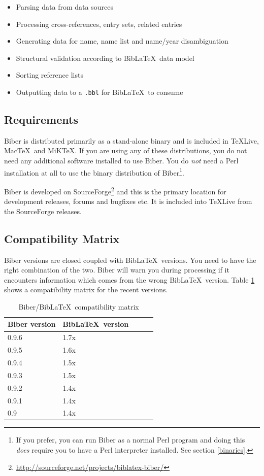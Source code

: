 \documentclass{ltxdockit}
\begin{document}
\begin{itemize}
\item Parsing data from data sources
\item Processing cross-references, entry sets, related entries
\item Generating data for name, name list and name/year disambiguation
\item Structural validation according to Bib\LaTeX\ data model
\item Sorting reference lists
\item Outputting data to a \verb+.bbl+ for Bib\LaTeX\ to consume
\end{itemize}

\subsection{Requirements}\label{ref:req}

Biber is distributed primarily as a stand-alone binary and is
included in \TeX Live, Mac\TeX\ and MiK\TeX. If you are using any of these
distributions, you do not need any additional software installed to use
Biber. You do \emph{not} need a Perl installation at all to use
the binary distribution of Biber\footnote{If you prefer, you can run
Biber as a normal Perl program and doing this \emph{does} require
you to have a Perl interpreter installed. See section \ref{binaries}.}.

Biber is developed on
SourceForge\footnote{\url{http://sourceforge.net/projects/biblatex-biber/}}
and this is the primary location for development releases, forums and
bugfixes etc. It is included into \TeX Live from the SourceForge releases.

\subsection{Compatibility Matrix}

Biber versions are closed coupled with Bib\LaTeX\ versions. You
need to have the right combination of the two. Biber will warn you
during processing if it encounters information which comes from the wrong
Bib\LaTeX\ version. Table \ref{tab:compat} shows a compatibility
matrix for the recent versions.

\begin{table}
\begin{center}
\small
\begin{tabular}{lllll}
\toprule
Biber version & Bib\LaTeX\ version\\
\midrule
0.9.6 & 1.7x\\
0.9.5 & 1.6x\\
0.9.4 & 1.5x\\
0.9.3 & 1.5x\\
0.9.2 & 1.4x\\
0.9.1 & 1.4x\\
0.9 & 1.4x\\
\bottomrule
\end{tabular}
\end{center}
\caption{Biber/Bib\LaTeX\ compatibility matrix}
\label{tab:compat}
\end{table}
\end{document}
